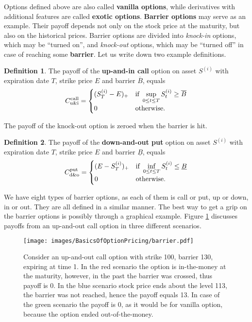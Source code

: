\documentclass[a4paper,11pt, twoside]{book}
\theoremstyle{definition}
\newtheorem{mydef}{Definition}[chapter]
\theoremstyle{remark}
\newcounter{example}[chapter]
\begin{document}
Options defined above are also called \textbf{vanilla options}, while derivatives with additional features are called \textbf{exotic options}. \textbf{Barrier options} may serve as an example. Their payoff depends not only on the stock price at the maturity, but also on the historical prices. Barrier options are divided into \textit{knock-in} options, which may be ``turned on'', and \textit{knock-out} options, which may be ``turned off'' in case of reaching some \textbf{barrier}. Let us write down two example definitions.
\begin{mydef}
The payoff of the \textbf{up-and-in call} option on asset $S^{(i)}$ with expiration date $T$, strike price $E$ and barrier $\overline{B}$, equals
\[ C^{\hbox{\scriptsize call}}_{\hbox{\scriptsize u\&i}} = 
\begin{cases}
 (S^{(i)}_T - E)_+    & \hbox{if } \sup\limits_{0 \leq t \leq T} S^{(i)}_t \geq \overline{B}\\
 0                    & \hbox{otherwise.}
\end{cases}
\]
\end{mydef}
\noindent The payoff of the knock-out option is zeroed when the barrier is hit.
\begin{mydef}
The payoff of the \textbf{down-and-out put} option on asset $S^{(i)}$ with expiration date $T$, strike price $E$ and barrier $\underline{B}$, equals
\[ C^{\hbox{\scriptsize put}}_{\hbox{\scriptsize d\&o}} = 
\begin{cases}
 (E - S^{(i)}_T)_+    & \hbox{if } \inf\limits_{0 \leq t \leq T} S^{(i)}_t \leq \underline{B}\\
 0                    & \hbox{otherwise.}
\end{cases}
\]
\end{mydef}
We have eight types of barrier options, as each of them is call or put, up or down, in or out. They are all defined in a similar manner. The best way to get a grip on the barrier options is possibly through a graphical example. Figure \ref{fig:barrier} discusses payoffs from an up-and-out call option in three different scenarios. 
\begin{figure}[!ht]
\centering
 \texttt{[image: images/BasicsOfOptionPricing/barrier.pdf]}
\caption{Consider an up-and-out call option with strike 100, barrier 130, expiring at time 1. In the red scenario the option is in-the-money at the maturity, however, in the past the barrier was crossed, thus payoff is 0. In the blue scenario stock price ends about the level 113, the barrier was not reached, hence the payoff equals 13. In case of the green scenario the payoff is 0, as it would be for vanilla option, because the option ended out-of-the-money. }
\label{fig:barrier}
\end{figure}
\end{document}
